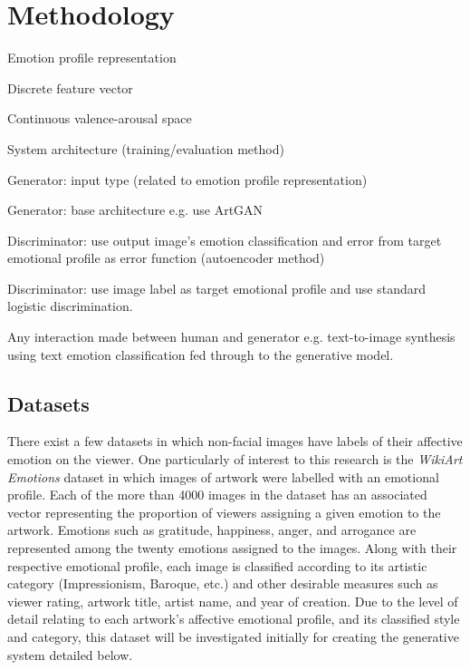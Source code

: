 \documentclass{article}
\begin{document}
\section{Methodology}

\begin{todolist}
	\item Emotion profile representation
	\begin{todolist}
		\item Discrete feature vector
		\item Continuous valence-arousal space
	\end{todolist}
	\item System architecture (training/evaluation method)
	\begin{todolist}
		\item Generator: input type (related to emotion profile representation)
		\item Generator: base architecture e.g. use ArtGAN \citep{tan2017artgan}
		\item Discriminator: use output image's emotion classification and error from target emotional profile as error function (autoencoder method)
		\item Discriminator: use image label as target emotional profile and use standard logistic discrimination.
	\end{todolist}
	\item Any interaction made between human and generator e.g. text-to-image synthesis using text emotion classification fed through to the generative model.
	
\end{todolist}

\subsection{Datasets}
There exist a few datasets in which non-facial images have labels of their affective emotion on the viewer.
One particularly of interest to this research is the \textit{WikiArt Emotions} dataset \citep{mohammad2018wikiart} in which images of artwork were labelled with an emotional profile.
Each of the more than 4000 images in the dataset has an associated vector representing the proportion of viewers assigning a given emotion to the artwork.
Emotions such as gratitude, happiness, anger, and arrogance are represented among the twenty emotions assigned to the images.
Along with their respective emotional profile, each image is classified according to its artistic category (Impressionism, Baroque, etc.) and other desirable measures such as viewer rating, artwork title, artist name, and year of creation.
Due to the level of detail relating to each artwork's affective emotional profile, and its classified style and category, this dataset will be investigated initially for creating the generative system detailed below.
\end{document}
